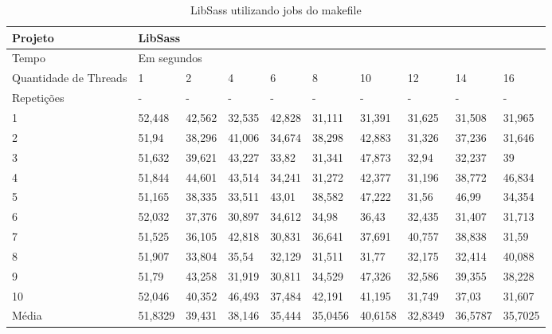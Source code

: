 \begin{table}[h]
\centering
\begin{tabular}{|p{1cm}|p{1.4cm}|p{1.4cm}|p{1.4cm}|p{1.4cm}|p{1.4cm}|p{1.4cm}|p{1.4cm}|p{1.4cm}|p{1.4cm}|}
\hline
Projeto               & \multicolumn{9}{l|}{LibSass}        \\ \hline
Tempo                 & \multicolumn{9}{l|}{Em segundos}      \\ \hline
Quantidade de Threads & 1 & 2 & 4 & 6 & 8 & 10 & 12 & 14 & 16 \\ \hline
Repetições            & - & - & - & - & - & -  & -  & -  & -  \\ \hline
1 & 52,448   & 42,562   & 32,535   & 42,828   & 31,111  & 31,391  & 31,625  & 31,508  & 31,965 \\ \hline
2 & 51,94    & 38,296   & 41,006   & 34,674   & 38,298  & 42,883  & 31,326  & 37,236  & 31,646 \\ \hline
3 & 51,632   & 39,621   & 43,227   & 33,82    & 31,341  & 47,873  & 32,94   & 32,237  & 39 \\ \hline
4 & 51,844   & 44,601   & 43,514   & 34,241   & 31,272  & 42,377  & 31,196  & 38,772  & 46,834 \\ \hline
5 & 51,165   & 38,335   & 33,511   & 43,01    & 38,582  & 47,222  & 31,56   & 46,99   & 34,354 \\ \hline
6 & 52,032   & 37,376   & 30,897   & 34,612   & 34,98   & 36,43   & 32,435  & 31,407  & 31,713 \\ \hline
7 & 51,525   & 36,105   & 42,818   & 30,831   & 36,641  & 37,691  & 40,757  & 38,838  & 31,59 \\ \hline
8 & 51,907   & 33,804   & 35,54    & 32,129   & 31,511  & 31,77   & 32,175  & 32,414  & 40,088 \\ \hline
9 & 51,79    & 43,258   & 31,919   & 30,811   & 34,529  & 47,326  & 32,586  & 39,355  & 38,228 \\ \hline
10& 52,046   & 40,352   & 46,493   & 37,484   & 42,191  & 41,195  & 31,749  & 37,03   & 31,607 \\ \hline
Média& 51,8329  & 39,431   & 38,146   & 35,444   & 35,0456 & 40,6158 & 32,8349 & 36,5787 & 35,7025 \\ \hline
\end{tabular}
\caption{LibSass utilizando jobs do makefile}
\label{tab:libsass}
\end{table}


